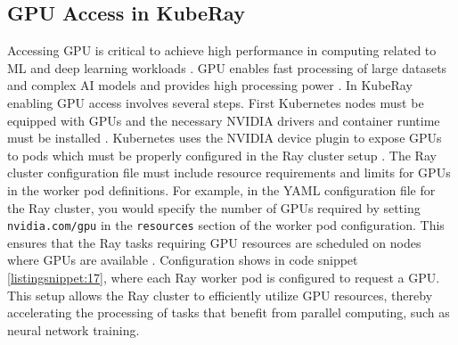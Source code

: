 
\subsection{GPU Access in KubeRay}

Accessing GPU is critical to achieve high performance in computing related to ML and deep learning  workloads \cite{nvidia_gpus_ai_ml}. GPU enables fast processing of large datasets and complex AI models and provides high processing power \cite{nvidia_gpus_ai_ml}. In KubeRay enabling GPU access involves several steps. First Kubernetes nodes must be equipped with GPUs and the necessary NVIDIA drivers and container runtime must be installed \cite{Kubernetes_doc}. Kubernetes uses the NVIDIA device plugin to expose GPUs to pods which must be properly configured in the Ray cluster setup \cite{Kubernetes_doc}. The Ray cluster configuration file must include resource requirements and limits for GPUs in the worker pod definitions. For example, in the YAML configuration file for the Ray cluster, you would specify the number of GPUs required by setting \texttt{nvidia.com/gpu} in the \texttt{resources} section of the worker pod configuration. This ensures that the Ray tasks requiring GPU resources are scheduled on nodes where GPUs are available \cite{ray_doc}. Configuration shows in code snippet \autoref{listingsnippet:17}, where each Ray worker pod is configured to request a GPU. This setup allows the Ray cluster to efficiently utilize GPU resources, thereby accelerating the processing of tasks that benefit from parallel computing, such as neural network training. \cite{ray_doc}

